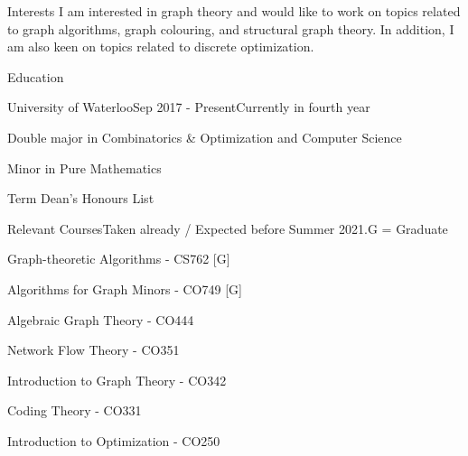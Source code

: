 \documentclass{cv}
\begin{document}
\begin{rSection}{Interests}
	I am interested in graph theory and would like to work on topics related to graph algorithms, graph colouring, and structural graph theory. In addition, I am also keen on topics related to discrete optimization.
\end{rSection}

\begin{rSection}{Education}

\begin{rSubsection}{University of Waterloo}{Sep 2017 - Present}{Currently in fourth year}{}
	\item Double major in Combinatorics \& Optimization and Computer Science
	\item Minor in Pure Mathematics
	\item Term Dean's Honours List
\end{rSubsection}


\begin{rSubsection}{Relevant Courses}{}{Taken already / Expected before Summer 2021.}{G = Graduate}
	\item Graph-theoretic Algorithms - CS762 [G]
	\item Algorithms for Graph Minors - CO749 [G]
	\item Algebraic Graph Theory - CO444
	\item Network Flow Theory - CO351
	\item Introduction to Graph Theory - CO342
	\item Coding Theory - CO331
	\item Introduction to Optimization - CO250
\end{rSubsection}


\end{rSection}
\end{document}
